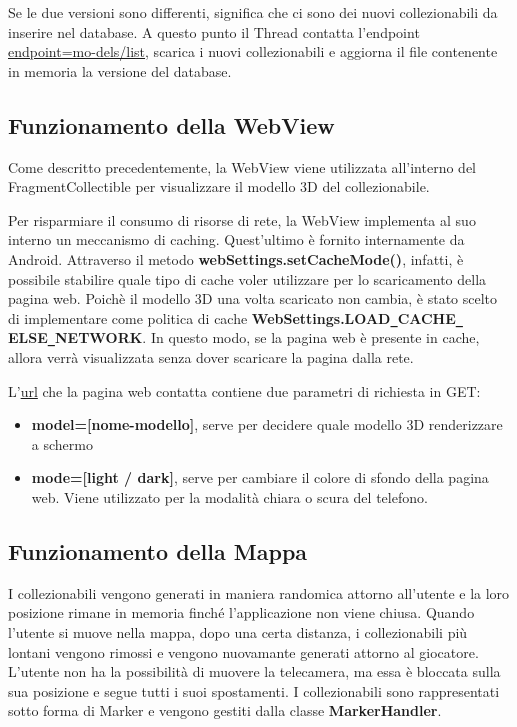 \documentclass{article}
\begin{document}
Se le due versioni sono differenti, significa che ci sono dei nuovi collezionabili da inserire nel database. A questo punto il Thread contatta l'endpoint
\href{https://backend.voxel.frangioniwebdev.com/api.php?endpoint=models/list}{endpoint=mo-dels/list}, scarica i nuovi collezionabili e aggiorna 
il file contenente in memoria la versione del database.

\subsection{Funzionamento della WebView}

Come descritto precedentemente, la WebView viene utilizzata all'interno del FragmentCollectible per visualizzare il modello 3D del collezionabile.

Per risparmiare il consumo di risorse di rete, la WebView implementa al suo interno un meccanismo di caching. Quest'ultimo è fornito internamente da 
Android. Attraverso il metodo \textbf{webSettings.setCacheMode()}, infatti, è possibile stabilire quale tipo di cache voler utilizzare per lo scaricamento della 
pagina web. Poichè il modello 3D una volta scaricato non cambia, è stato scelto di implementare come politica di cache \textbf{WebSettings.LOAD\texttt{\_}CACHE\texttt{\_}
ELSE\texttt{\_}NETWORK}. In questo modo, se la pagina web è presente in cache, allora verrà visualizzata senza dover scaricare la pagina dalla rete.

\medskip

L'\href{https://voxel.frangioniwebdev.com/?model=adventure-time&mode=light}{url} che la pagina web contatta contiene due parametri di richiesta in GET:
\begin{itemize}
    \itemsep 0em 
    \item \textbf{model=[nome-modello]}, serve per decidere quale modello 3D renderizzare a schermo
    \item \textbf{mode=[light / dark]}, serve per cambiare il colore di sfondo della pagina web. Viene utilizzato per la modalità chiara o scura del telefono.
\end{itemize}

\subsection{Funzionamento della Mappa}

I collezionabili vengono generati in maniera randomica attorno all'utente e la loro posizione rimane in memoria finché
l'applicazione non viene chiusa. Quando l'utente si muove nella mappa, dopo una certa distanza, i collezionabili più lontani vengono
rimossi e vengono nuovamante generati attorno al giocatore. L'utente non ha la possibilità di muovere la telecamera, ma essa è bloccata sulla sua
posizione e segue tutti i suoi spostamenti. I collezionabili sono rappresentati sotto forma di Marker e vengono gestiti dalla classe \textbf{MarkerHandler}.
\end{document}
